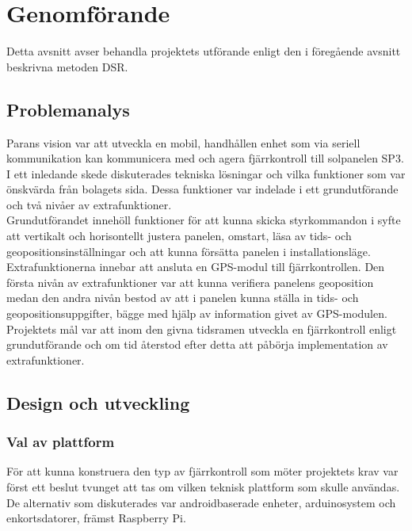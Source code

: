 \documentclass{article}
\begin{document}
    \newpage

    \section{Genomförande} %
    \label{sec:genomforande}
        Detta avsnitt avser behandla projektets utförande enligt den i föregående avsnitt beskrivna metoden DSR.
        
        \subsection{Problemanalys} %
        \label{sub:problemanalys}
            Parans vision var att utveckla en mobil, handhållen enhet som via seriell kommunikation kan kommunicera med och agera fjärrkontroll till solpanelen SP3.  I ett inledande skede diskuterades tekniska lösningar och vilka funktioner som var önskvärda från bolagets sida. Dessa funktioner var indelade i ett grundutförande och två nivåer av extrafunktioner. \\
            
            \noindent Grundutförandet innehöll funktioner för att kunna skicka styrkommandon i syfte att vertikalt och horisontellt justera panelen, omstart, läsa av tids- och geopositionsinställningar och att kunna försätta panelen i installationsläge. \\
            
            \noindent Extrafunktionerna innebar att ansluta en GPS-modul till fjärrkontrollen. Den första nivån av extrafunktioner var att kunna verifiera panelens geoposition medan den andra nivån bestod av att i panelen kunna ställa in tids- och geopositionsuppgifter, bägge med hjälp av information givet av GPS-modulen. Projektets mål var att inom den givna tidsramen utveckla en fjärrkontroll enligt grundutförande och om tid återstod efter detta att påbörja implementation av extrafunktioner.

        \subsection{Design och utveckling} %
        \label{sub:design_och_utveckling}
        
            \subsubsection{Val av plattform} %
            \label{subsub:val_av_plattform}
            För att kunna konstruera den typ av fjärrkontroll som möter projektets krav var först ett beslut tvunget att tas om vilken teknisk plattform som skulle användas. De alternativ som diskuterades var androidbaserade enheter, arduinosystem och enkortsdatorer, främst Raspberry Pi.\\
            
\end{document}
